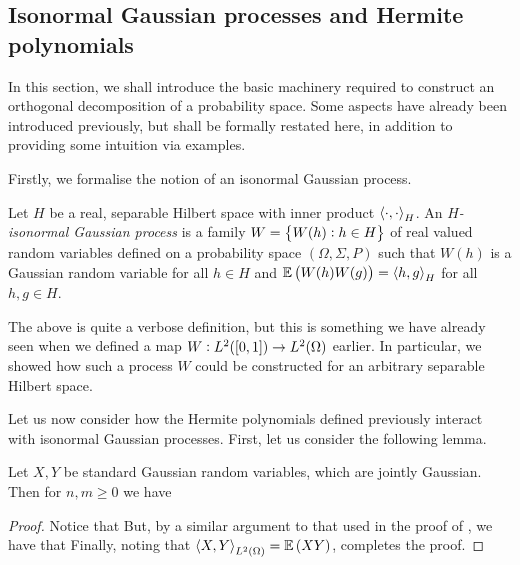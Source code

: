 \documentclass[../main.tex]{subfiles}
\begin{document}
\subsection{Isonormal Gaussian processes and Hermite polynomials}

In this section, we shall introduce the basic machinery required to construct an orthogonal decomposition of a probability space. Some aspects have already been introduced previously, but shall be formally restated here, in addition to providing some intuition via examples.

Firstly, we formalise the notion of an isonormal Gaussian process.
\begin{definition}
\label{def:iso_gauss_process}
Let $H$ be a real, separable Hilbert space with inner product $\left\langle \cdot,\cdot \right\rangle_H$. An \emph{$H$-isonormal Gaussian process} is a family $W = \cbr{W(h):h\in H}$ of real valued random variables defined on a probability space $(\Omega,\Sigma,P)$ such that $W(h)$ is a Gaussian random variable for all $h\in H$ and $\Ex\del{W(h)W(g)} = \abrac{h,g}_H$ for all $h,g\in H$.
\end{definition}
The above is quite a verbose definition, but this is something we have already seen when we defined a map $W:L^2(\intcc{0,1})\to L^2(\Omega)$ earlier. In particular, we showed how such a process $W$ could be constructed for an arbitrary separable Hilbert space.

Let us now consider how the Hermite polynomials defined previously interact with isonormal Gaussian processes. First, let us consider the following lemma.

\begin{lemma}
\label{lem:hermite_orthogonality}
Let $X,Y$ be standard Gaussian random variables, which are jointly Gaussian. Then for $n,m\geq0$ we have 
\end{lemma}
\begin{proof}
Notice that  But, by a similar argument to that used in the proof of , we have that  Finally, noting that $\abrac{X,Y}_{L^2(\Omega)} = \Ex\del{XY}$, completes the proof.
\end{proof}
\end{document}
